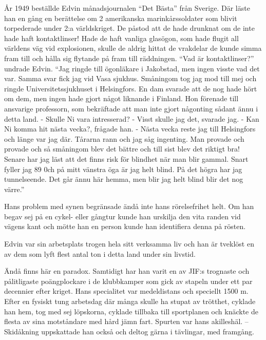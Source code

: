 År 1949 beställde Edvin månadsjournalen ``Det Bästa'' från Sverige. Där läste han en gång en berättelse om 2 amerikanska marinkårssoldater som blivit torpederade under 2:a världskriget. De påstod att de hade drunknat om de inte hade haft kontaktlinser! Hade de haft vanliga glasögon, som hade flugit all världens väg vid explosionen, skulle de aldrig hittat de vrakdelar de kunde simma fram till och hålla sig flytande på fram till räddningen. ``Vad är kontaktlinser?'' undrade Edvin. ``Jag ringde till ögonläkare i Jakobstad, men ingen visste vad det var. Samma svar fick jag vid Vasa sjukhus. Småningom tog jag mod till mej och ringde Universitetssjukhuset i Helsingfors. En dam svarade att de nog hade hört om dem, men ingen hade gjort något liknande i Finland. Hon förenade till ansvarige professorn, som bekräftade att man inte gjort någonting sådant ännu i detta land.\newline
\indent  - Skulle Ni vara intresserad? \newline
\indent  - Visst skulle jag det, svarade jag.\newline
\indent  - Kan Ni komma hit nästa vecka?, frågade han.\newline
\indent  - Nästa vecka reste jag till Helsingfors och länge var jag där. Tårarna rann och jag såg ingenting. Man provade och provade och så småningom blev det bättre och till sist blev det riktigt bra! Senare har jag läst att det finns risk för blindhet när man blir gammal. Snart fyller jag 89 0ch på mitt vänstra öga är jag helt blind. På det högra har jag tunnelseende. Det går ännu här hemma, men blir jag helt blind blir det nog värre.''

Hans problem med synen begränsade ändå inte hans rörelsefrihet helt. Om han begav sej på en cykel- eller gångtur kunde han urskilja den vita randen vid vägens kant och mötte han en person kunde han identifiera denna på rösten.

Edvin var sin arbetsplats trogen hela sitt verksamma liv och han är tveklöst en av dem som lyft flest antal ton i detta land under sin livstid.

Ändå finns här en paradox. Samtidigt har han varit en av JIF:s trognaste och pålitligaste poängplockare i de klubbkamper som gick av stapeln under ett par decennier efter kriget. Hans specialitet var medeldistans och speciellt 1500 m. Efter en fysiskt tung arbetsdag där många skulle ha stupat av trötthet, cyklade han hem, tog med sej löpskorna, cyklade tillbaka till sportplanen och knäckte de flesta av sina motståndare med  hård jämn fart. Spurten var hans akilleshäl. -- Skidåkning uppskattade han också och deltog gärna i tävlingar, med framgång.

